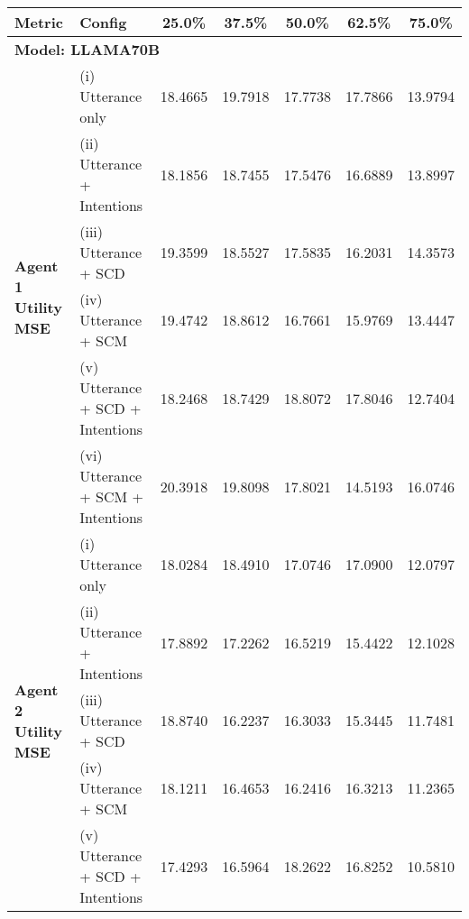 \begin{table*}[ht]
\centering
\begin{tabular}{llccccc}
\hline
\textbf{Metric} & \textbf{Config} & \textbf{25.0\%} & \textbf{37.5\%} & \textbf{50.0\%} & \textbf{62.5\%} & \textbf{75.0\%} \\
\hline
\multicolumn{7}{l}{\textbf{Model: LLAMA70B}} \\
\midrule
\multirow{6}{*}{\textbf{Agent 1 Utility MSE}} & (i) Utterance only & 18.4665 & 19.7918 & 17.7738 & 17.7866 & 13.9794 \\
 & (ii) Utterance + Intentions & \cellcolor{green!25}18.1856 & \cellcolor{green!25}18.7455 & \cellcolor{green!25}17.5476 & \cellcolor{green!25}16.6889 & \cellcolor{green!25}13.8997 \\
 & (iii) Utterance + SCD & \cellcolor{red!25}19.3599 & \cellcolor{green!25}18.5527 & \cellcolor{green!25}17.5835 & \cellcolor{green!25}16.2031 & \cellcolor{red!25}14.3573 \\
 & (iv) Utterance + SCM & \cellcolor{red!25}19.4742 & \cellcolor{green!25}18.8612 & \cellcolor{green!25}16.7661 & \cellcolor{green!25}15.9769 & \cellcolor{green!25}13.4447 \\
 & (v) Utterance + SCD + Intentions & \cellcolor{green!25}18.2468 & \cellcolor{green!25}18.7429 & \cellcolor{red!25}18.8072 & \cellcolor{red!25}17.8046 & \cellcolor{green!25}12.7404 \\
 & (vi) Utterance + SCM + Intentions & \cellcolor{red!25}20.3918 & \cellcolor{red!25}19.8098 & \cellcolor{red!25}17.8021 & \cellcolor{green!25}14.5193 & \cellcolor{red!25}16.0746 \\
\midrule
\multirow{6}{*}{\textbf{Agent 2 Utility MSE}} & (i) Utterance only & 18.0284 & 18.4910 & 17.0746 & 17.0900 & 12.0797 \\
 & (ii) Utterance + Intentions & \cellcolor{green!25}17.8892 & \cellcolor{green!25}17.2262 & \cellcolor{green!25}16.5219 & \cellcolor{green!25}15.4422 & \cellcolor{red!25}12.1028 \\
 & (iii) Utterance + SCD & \cellcolor{red!25}18.8740 & \cellcolor{green!25}16.2237 & \cellcolor{green!25}16.3033 & \cellcolor{green!25}15.3445 & \cellcolor{green!25}11.7481 \\
 & (iv) Utterance + SCM & \cellcolor{red!25}18.1211 & \cellcolor{green!25}16.4653 & \cellcolor{green!25}16.2416 & \cellcolor{green!25}16.3213 & \cellcolor{green!25}11.2365 \\
 & (v) Utterance + SCD + Intentions & \cellcolor{green!25}17.4293 & \cellcolor{green!25}16.5964 & \cellcolor{red!25}18.2622 & \cellcolor{green!25}16.8252 & \cellcolor{green!25}10.5810 \\

\end{tabular}
\end{table*}
